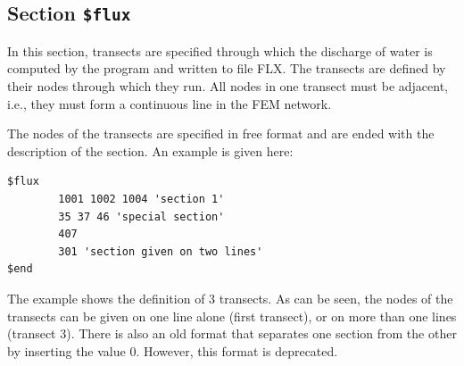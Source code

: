 \subsection{Section {\tt \$flux}}

In this section, transects are specified through which the discharge
of water is computed by the program and written to file FLX.
The transects are defined by their nodes through which they run.
All nodes in one transect must be adjacent, i.e., they must form a
continuous line in the FEM network.

The nodes of the transects are specified in free format and are
ended with the description of the section.
An example is given here:
\begin{verbatim}
$flux
        1001 1002 1004 'section 1'
        35 37 46 'special section'
        407
        301 'section given on two lines'
$end
\end{verbatim}
The example shows the definition of 3 transects. As can be seen, the
nodes of the transects can be given on one line alone (first transect),
or on more than one lines (transect 3).
There is also an old format that separates one section from the other by
inserting the value 0. However, this format is deprecated.

